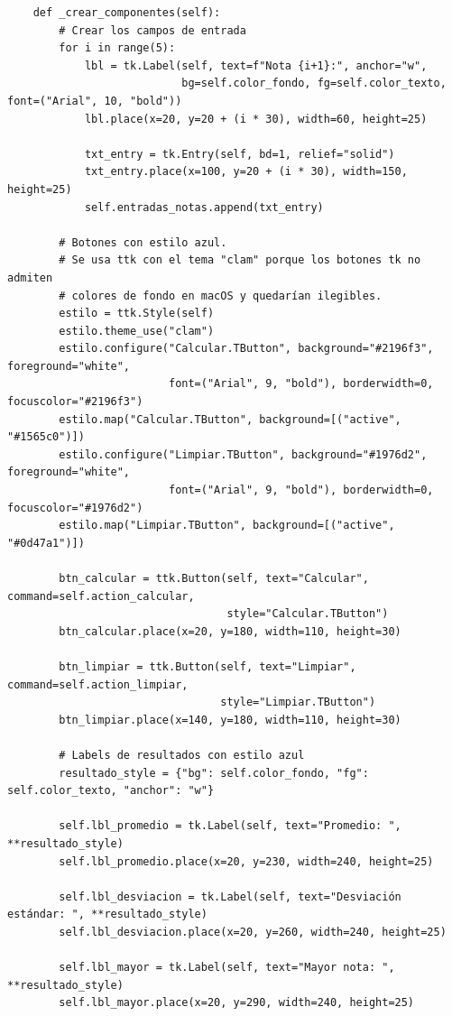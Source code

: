 \documentclass[11pt, a4paper]{article}
\begin{document}
\begin{lstlisting}
    def _crear_componentes(self):
        # Crear los campos de entrada
        for i in range(5):
            lbl = tk.Label(self, text=f"Nota {i+1}:", anchor="w", 
                           bg=self.color_fondo, fg=self.color_texto, font=("Arial", 10, "bold"))
            lbl.place(x=20, y=20 + (i * 30), width=60, height=25)
            
            txt_entry = tk.Entry(self, bd=1, relief="solid")
            txt_entry.place(x=100, y=20 + (i * 30), width=150, height=25)
            self.entradas_notas.append(txt_entry)

        # Botones con estilo azul.
        # Se usa ttk con el tema "clam" porque los botones tk no admiten
        # colores de fondo en macOS y quedarían ilegibles.
        estilo = ttk.Style(self)
        estilo.theme_use("clam")
        estilo.configure("Calcular.TButton", background="#2196f3", foreground="white",
                         font=("Arial", 9, "bold"), borderwidth=0, focuscolor="#2196f3")
        estilo.map("Calcular.TButton", background=[("active", "#1565c0")])
        estilo.configure("Limpiar.TButton", background="#1976d2", foreground="white",
                         font=("Arial", 9, "bold"), borderwidth=0, focuscolor="#1976d2")
        estilo.map("Limpiar.TButton", background=[("active", "#0d47a1")])

        btn_calcular = ttk.Button(self, text="Calcular", command=self.action_calcular,
                                  style="Calcular.TButton")
        btn_calcular.place(x=20, y=180, width=110, height=30)

        btn_limpiar = ttk.Button(self, text="Limpiar", command=self.action_limpiar,
                                 style="Limpiar.TButton")
        btn_limpiar.place(x=140, y=180, width=110, height=30)

        # Labels de resultados con estilo azul
        resultado_style = {"bg": self.color_fondo, "fg": self.color_texto, "anchor": "w"}
        
        self.lbl_promedio = tk.Label(self, text="Promedio: ", **resultado_style)
        self.lbl_promedio.place(x=20, y=230, width=240, height=25)
        
        self.lbl_desviacion = tk.Label(self, text="Desviación estándar: ", **resultado_style)
        self.lbl_desviacion.place(x=20, y=260, width=240, height=25)
        
        self.lbl_mayor = tk.Label(self, text="Mayor nota: ", **resultado_style)
        self.lbl_mayor.place(x=20, y=290, width=240, height=25)
        

\end{lstlisting}
\end{document}
